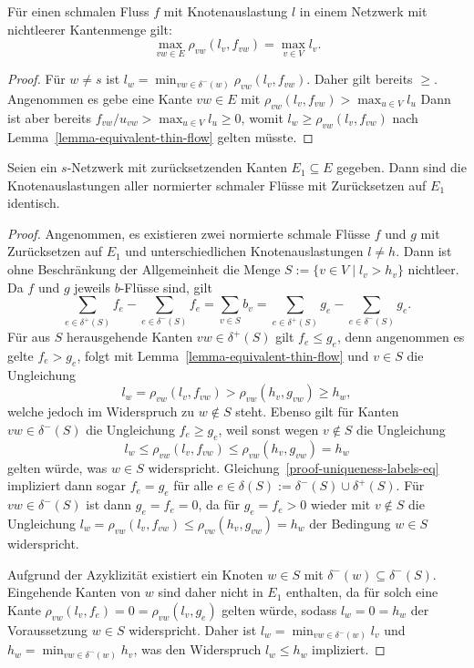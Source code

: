 \begin{corollary}
	Für einen schmalen Fluss $f$ mit Knotenauslastung $l$ in einem Netzwerk mit nichtleerer Kantenmenge gilt:
	\[
		\max_{vw\in E} \rho_{vw}(l_v, f_{vw}) = \max_{v\in V} l_v.
	\]
\end{corollary}
\begin{proof}
	Für $w\neq s$ ist $l_w = \min_{vw\in\delta^-(w)} \rho_{vw}(l_v, f_{vw})$.
	Daher gilt bereits \glqq$\geq$\grqq.
	Angenommen es gebe eine Kante $vw\in E$ mit $\rho_{vw}(l_v, f_{vw}) > \max_{u\in V} l_u$
	Dann ist aber bereits $f_{vw}/u_{vw} > \max_{u\in V} l_u \geq 0$, womit $l_w \geq \rho_{vw}(l_v, f_{vw})$ nach Lemma~\ref{lemma-equivalent-thin-flow} gelten müsste.
\end{proof}

\begin{lemma}\label{lemma-node-congestion-unique}
	Seien ein $s$-Netzwerk mit zurücksetzenden Kanten $E_1\subseteq E$ gegeben.
	Dann sind die Knotenauslastungen aller normierter schmaler Flüsse mit Zurücksetzen auf $E_1$ identisch.
\end{lemma}
\begin{proof}
	Angenommen, es existieren zwei normierte schmale Flüsse $f$ und $g$ mit Zurück\-setzen auf $E_1$ und unterschiedlichen Knotenauslastungen $l\neq h$.
	Dann ist ohne Beschränkung der Allgemeinheit die Menge $S:=\{ v\in V \mid l_v > h_v \}$ nichtleer.
	Da $f$ und $g$ jeweils $b$-Flüsse sind, gilt 
	\begin{equation}\label{proof-uniqueness-labels-eq}
	\sum_{e\in \delta^+(S)} f_e - \sum_{e\in\delta^-(S)} f_e = \sum_{v\in S} b_v = \sum_{e\in\delta^+(S)} g_e - \sum_{e\in\delta^-(S)} g_e.
	\end{equation}
	Für aus $S$ herausgehende Kanten $vw\in \delta^+(S)$ gilt $f_e \leq g_e$, denn angenommen es gelte $f_e > g_e$, folgt mit Lemma~\ref{lemma-equivalent-thin-flow} und $v\in S$ die Ungleichung 
	\[l_w = \rho_{vw}(l_v, f_{vw}) > \rho_{vw}(h_v, g_{vw})\geq h_w,\]
	welche jedoch im Widerspruch zu $w\notin S$ steht.
	Ebenso gilt für Kanten $vw\in\delta^-(S)$ die Ungleichung $f_e \geq g_e$, weil sonst wegen $v\notin S$ die Ungleichung
	\[l_w \leq \rho_{vw}(l_v, f_{vw}) \leq \rho_{vw}(h_v, g_{vw}) = h_w\]
	gelten würde, was $w\in S$ widerspricht.
	Gleichung~\ref{proof-uniqueness-labels-eq} impliziert dann sogar $f_e = g_e$ für alle $e\in \delta(S):=\delta^-(S) \cup \delta^+(S)$.
	Für $vw\in \delta^-(S)$ ist dann $g_e=f_e=0$, da für $g_e=f_e>0$ wieder mit $v\notin S$ die Ungleichung $l_w = \rho_{vw}(l_v, f_{vw})\leq \rho_{vw}(h_v, g_{vw})=h_w$ der Bedingung $w\in S$ widerspricht.
	
	Aufgrund der Azyklizität existiert ein Knoten $w\in S$ mit $\delta^-(w)\subseteq \delta^-(S)$.
	Eingehende Kanten von $w$ sind daher nicht in $E_1$ enthalten, da für solch eine Kante $\rho_{vw}(l_v, f_e) = 0 = \rho_{vw}(l_v, g_e)$ gelten würde, sodass $l_w = 0 = h_w$ der Voraussetzung $w\in S$ widerspricht.
	Daher ist $l_w = \min_{vw\in \delta^-(w)} l_v$ und $h_w = \min_{vw\in\delta^-(w)} h_v$, was den Widerspruch $l_w \leq h_w$ impliziert.
\end{proof}

